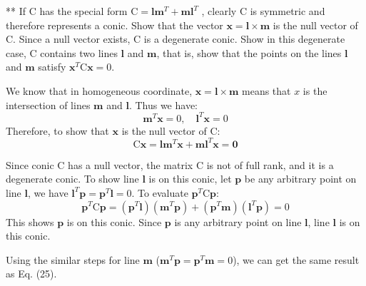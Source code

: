 \begin{questions}
\begin{parts}
\begin{subparts}
        \subpart
        ** If $\mathrm { C }$ has the special form $\mathrm { C } = \mathbf{l} \mathbf{m} ^ {T} + \mathbf{m} \mathbf{l} ^ {T}$ , clearly $\mathrm { C }$ is symmetric and therefore represents a conic. Show that the vector $\mathbf{x} = \mathbf{l} \times \mathbf{m}$ is the null vector of $\mathrm { C }$. Since a null vector exists, $\mathrm { C }$ is a degenerate conic. Show in this degenerate case, $\mathrm { C }$ contains two lines $\mathbf{l}$ and $\mathbf{m}$, that is, show that the points on the lines $\mathbf{l}$ and $\mathbf{m}$ satisfy $\mathbf { x } ^ { T }   \mathrm{C}  \mathbf { x } = 0$.
        
        \begin{solution}
            We know that in homogeneous coordinate, $\mathbf{x} = \mathbf{l} \times \mathbf{m}$ means that $x$ is the intersection of lines $\mathbf{m}$ and $\mathbf{l}$. Thus we have:
            \begin{equation}
                \mathbf{m} ^ {T} \mathbf{x} = 0, \quad \mathbf{l} ^ {T} \mathbf{x} = 0
            \end{equation}
            Therefore, to show that $\mathbf{x}$ is the null vector of $\mathrm { C }$:
            \begin{equation}
                    \mathrm { C } \mathbf{x} = \mathbf{l} \mathbf{m} ^ {T} \mathbf{x} + \mathbf{m} \mathbf{l} ^ {T} \mathbf{x} = \mathbf{0}
            \end{equation}
            
            Since conic $\mathrm{C}$ has a null vector, the matrix $\mathrm{C}$ is not of full rank, and it is a degenerate conic. To show line $\mathbf{l}$ is on this conic, let $\mathbf{p}$ be any arbitrary point on line $\mathbf{l}$, we have $\mathbf{l} ^ {T} \mathbf{p} = \mathbf { p } ^ { T } \mathbf { l }  = 0$. To evaluate $\mathbf{p} ^ {T} \mathrm{C} \mathbf{p}$:
            \begin{equation}
                \mathbf { p } ^ { T } \mathrm { C } \mathbf { p } = \left( \mathbf { p } ^ { T } \mathbf { l } \right) \left( \mathbf { m } ^ { T } \mathbf { p } \right) + \left( \mathbf { p } ^ { T } \mathbf { m } \right) \left( \mathbf { l } ^ { T } \mathbf { p } \right) = 0
            \end{equation}
            This shows $\mathbf{p}$ is on this conic. Since $\mathbf{p}$ is any arbitrary point on line $\mathbf{l}$, line $\mathbf{l}$ is on this conic.
            
            Using the similar steps for line $\mathbf{m}$ ($\mathbf{m} ^ {T} \mathbf{p} = \mathbf { p } ^ { T } \mathbf { m }  = 0$), we can get the same result as Eq. (25). 
            

\end{solution}
\end{subparts}
\end{parts}
\end{questions}
